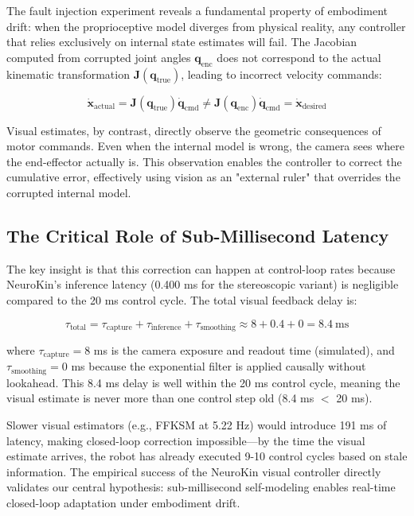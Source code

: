 \documentclass[12pt,a4paper,oneside]{report}
\begin{document}
The fault injection experiment reveals a fundamental property of embodiment drift: when the proprioceptive model diverges from physical reality, any controller that relies exclusively on internal state estimates will fail. The Jacobian computed from corrupted joint angles $\mathbf{q}_{\text{enc}}$ does not correspond to the actual kinematic transformation $\mathbf{J}(\mathbf{q}_{\text{true}})$, leading to incorrect velocity commands:

\begin{equation}
\dot{\mathbf{x}}_{\text{actual}} = \mathbf{J}(\mathbf{q}_{\text{true}}) \dot{\mathbf{q}}_{\text{cmd}} \neq \mathbf{J}(\mathbf{q}_{\text{enc}}) \dot{\mathbf{q}}_{\text{cmd}} = \dot{\mathbf{x}}_{\text{desired}}
\end{equation}

Visual estimates, by contrast, directly observe the geometric consequences of motor commands. Even when the internal model is wrong, the camera sees where the end-effector actually is. This observation enables the controller to correct the cumulative error, effectively using vision as an "external ruler" that overrides the corrupted internal model.

\subsection{The Critical Role of Sub-Millisecond Latency}

The key insight is that this correction can happen at control-loop rates because NeuroKin's inference latency (0.400 ms for the stereoscopic variant) is negligible compared to the 20 ms control cycle. The total visual feedback delay is:

\begin{equation}
\tau_{\text{total}} = \tau_{\text{capture}} + \tau_{\text{inference}} + \tau_{\text{smoothing}} \approx 8 + 0.4 + 0 = 8.4\ \text{ms}
\end{equation}

where $\tau_{\text{capture}} = 8$ ms is the camera exposure and readout time (simulated), and $\tau_{\text{smoothing}} = 0$ ms because the exponential filter is applied causally without lookahead. This 8.4 ms delay is well within the 20 ms control cycle, meaning the visual estimate is never more than one control step old (8.4 ms $<$ 20 ms).

Slower visual estimators (e.g., FFKSM at 5.22 Hz) would introduce 191 ms of latency, making closed-loop correction impossible—by the time the visual estimate arrives, the robot has already executed 9-10 control cycles based on stale information. The empirical success of the NeuroKin visual controller directly validates our central hypothesis: sub-millisecond self-modeling enables real-time closed-loop adaptation under embodiment drift.
\end{document}
